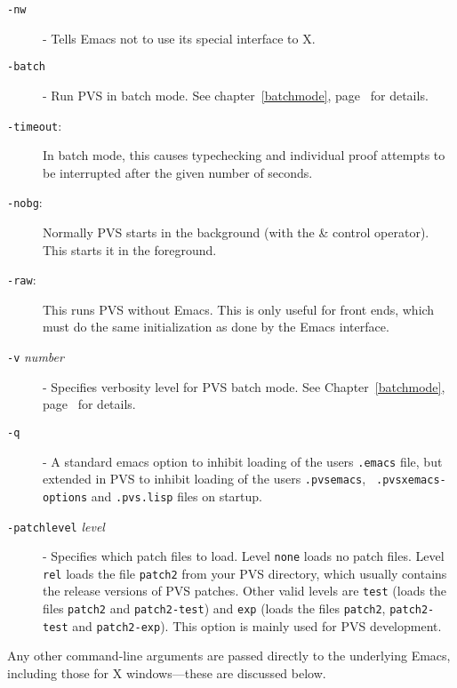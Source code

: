 \begin{description}
\item[\texttt{-nw}] - Tells
Emacs not to use its special interface to X.

\item[\texttt{-batch}]
- Run PVS in batch mode. See chapter~\ref{batchmode},
page~\pageref{batchmode} for details.

\item[\texttt{-timeout}:] In batch mode, this causes typechecking and individual proof
attempts to be interrupted after the given number of seconds.

\item[\texttt{-nobg}:]
Normally PVS starts in the background (with the \& control operator).
This starts it in the foreground.

\item[\texttt{-raw}:] This
runs PVS without Emacs.  This is only useful for front ends, which must do
the same initialization as done by the Emacs interface.

\item[\texttt{-v} \emph{number}] - Specifies verbosity level for PVS batch mode. See
Chapter~\ref{batchmode}, page~\pageref{batchmode} for details.

\label{dash-q-option}
\item[\texttt{-q}] - A
standard emacs option to inhibit loading of the users {\tt .emacs} file,
but extended in PVS to inhibit loading of the users {\tt .pvsemacs}, {\tt
.pvsxemacs-options} and \texttt{.pvs.lisp} files on startup.

\item[\texttt{-patchlevel}
\emph{level}] - Specifies which patch files to load. Level \texttt{none} loads
no patch files. Level \texttt{rel} loads the file \texttt{patch2} from
your PVS directory, which usually contains the release versions of PVS
patches. Other valid levels are \texttt{test} (loads the files
\texttt{patch2} and \texttt{patch2-test}) and \texttt{exp} (loads the
files \texttt{patch2}, \texttt{patch2-test} and \texttt{patch2-exp}).
This option is mainly used for PVS development.


\end{description}
Any other command-line arguments are passed directly to the underlying
Emacs, including those for X windows---these are discussed
below.

